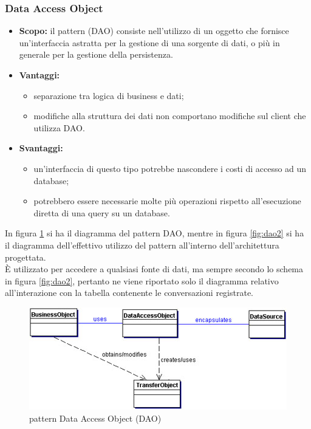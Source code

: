    \subsubsection{Data Access Object}
      \begin{itemize}
       \item \textbf{Scopo:} il pattern  (DAO) consiste nell'utilizzo di un oggetto che fornisce un'interfaccia astratta per la gestione di una sorgente di dati, o più in generale per la gestione della persistenza.
	\item \textbf{Vantaggi:}
	  \begin{itemize}
	   \item separazione tra logica di business e dati;
	   \item modifiche alla struttura dei dati non comportano modifiche sul client che utilizza DAO.
	  \end{itemize}
	\item \textbf{Svantaggi:}
	  \begin{itemize}
	   \item un'interfaccia di questo tipo potrebbe nascondere i costi di accesso ad un database;
	   \item potrebbero essere necessarie molte più operazioni rispetto all'esecuzione diretta di una query su un database.
	  \end{itemize}
	\end{itemize}
In figura \ref{fig:dao1} si ha il diagramma del pattern DAO, mentre in figura \ref{fig:dao2} si ha il diagramma dell'effettivo utilizzo del pattern all'interno dell'architettura progettata.\\
È utilizzato per accedere a qualsiasi fonte di dati, ma sempre secondo lo schema in figura \ref{fig:dao2}, pertanto ne viene riportato solo il diagramma relativo all'interazione con la tabella  contenente le conversazioni registrate.
	\begin{figure}[h]
		\centering
		\includegraphics[width=\textwidth,height=\textheight,keepaspectratio,scale=0.1]{images/DAOpattern.jpg}
		\caption{pattern Data Access Object (DAO)}\label{fig:dao1}
	\end{figure}
